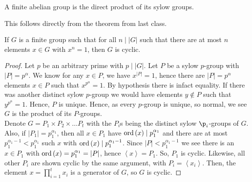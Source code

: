 \begin{corollary}
	A finite abelian group is the direct product of its sylow groups.
\end{corollary}
This follows directly from the theorem from last class.
\begin{corollary}
	If \(G\) is a finite group such that for all \(n \mid \left| G \right| \) such that there are at most \(n\) elements \(x \in G\) with \(x^{n}= 1\), then \(G\) is cyclic.
\end{corollary}
\begin{proof}
	Let \(p\) be an arbitrary prime with \(p \mid \left| G \right| \). Let \(P\) be a sylow \(p\)-group with \(\left| P \right| = p^{\alpha}\). We know for any \(x \in P\), we have \(x^{\left| P \right| } = 1\), hence there are \(\left| P \right|  = p^{\alpha}\) elements \(x \in P\) such that \(x^{p^{\alpha}} = 1\). By hypothesis there is infact equality. If there was another distinct sylow \(p\)-group we would have elements \(y \not\in P\) such that \(y^{p^{\alpha}} = 1\). Hence, \(P\) is unique. Hence, as every \(p\)-group is unique, so normal, we see \(G\) is the product of its \(P\)-groups.\\
	Denote \(G = P_1 \times P_2 \times  \ldots P_{t}\) with the \(P_{i}\)s being the distinct sylow \(\p_{i}\)-groups of \(G\). Also, if \(\left| P_1 \right|  = p_1^{\alpha_1}\), then all \(x \in P_1\) have \(\operatorname{ord}\left( x \right) \mid p_1^{\alpha_1}\) and there are at most \(p_1^{\alpha_1 -1} < p_1^{\alpha_1}\) such \(x\) with \(\operatorname{ord}\left( x \right)  \mid p_1^{\alpha_1 - 1}\). Since \(\left| P \right|  < p_1^{\alpha_1 -1}\) we see there is an \(x \in P_1\) with \(\operatorname{ord}\left( x \right) = p_1^{\alpha_1} = \left| P \right| \), hence \(\left<x \right>  = P_1\). So, \(P_1\) is cyclic. Likewise, all other \(P_{i}\) are shown cyclic by the same argument, with \(P_{i} = \left<x_{i} \right> \). Then, the element \(x = \prod_{i= 1}^{t} x_{i}\) is a generator of \(G\), so \(G\) is cyclic.
\end{proof}
